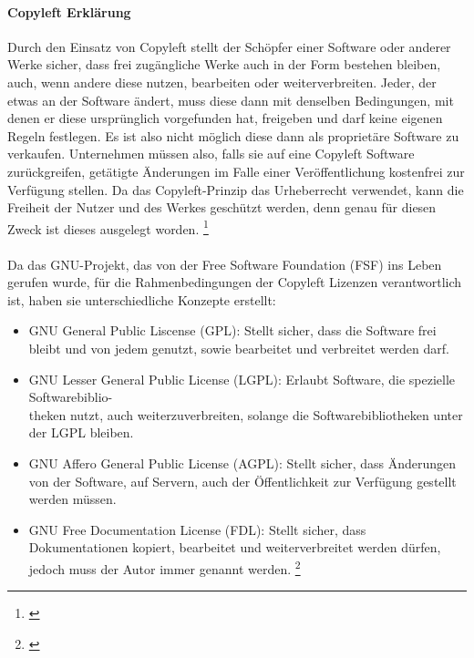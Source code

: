 \documentclass[titlepage,12pt,twoside]{article}
\begin{document}
\paragraph{Copyleft Erklärung}
\hfill \break
\hfill \break
Durch den Einsatz von Copyleft stellt der Schöpfer einer Software oder anderer Werke sicher, dass frei 
zugängliche Werke auch in der Form bestehen bleiben, auch, wenn andere diese nutzen, bearbeiten oder 
weiterverbreiten. Jeder, der etwas an der Software ändert, muss diese dann mit denselben Bedingungen, mit 
denen er diese ursprünglich vorgefunden hat, freigeben und darf keine eigenen Regeln festlegen. Es ist also 
nicht möglich diese dann als proprietäre Software zu verkaufen. Unternehmen müssen also, falls sie auf eine 
Copyleft Software zurückgreifen, getätigte Änderungen im Falle einer Veröffentlichung kostenfrei zur Verfügung 
stellen. Da das Copyleft-Prinzip das Urheberrecht verwendet, kann die Freiheit der Nutzer und des Werkes 
geschützt werden, denn genau für diesen Zweck ist dieses ausgelegt worden. \footnote{\cite{GNU}} \\
\\
Da das GNU-Projekt, das von der Free Software Foundation (FSF) ins Leben gerufen wurde, für die 
Rahmenbedingungen der Copyleft Lizenzen verantwortlich ist, haben sie unterschiedliche Konzepte erstellt: \\ 
\begin{itemize}
	\item GNU General Public Liscense (GPL): Stellt sicher, dass die Software frei bleibt und von jedem 
	genutzt, sowie bearbeitet und verbreitet werden darf.
	\item GNU Lesser General Public License (LGPL): Erlaubt Software, die spezielle Softwarebiblio-\\theken 
	nutzt, auch weiterzuverbreiten, solange die Softwarebibliotheken unter der LGPL bleiben.
	\item GNU Affero General Public License (AGPL): Stellt sicher, dass Änderungen von der Software, auf 
	Servern, auch der Öffentlichkeit zur Verfügung gestellt werden müssen.
	\item GNU Free Documentation License (FDL): Stellt sicher, dass Dokumentationen kopiert, bearbeitet und 
	weiterverbreitet werden dürfen, jedoch muss der Autor immer genannt werden. \footnote{\cite{GNU}}
\end{itemize}
\hfill \break
\end{document}
